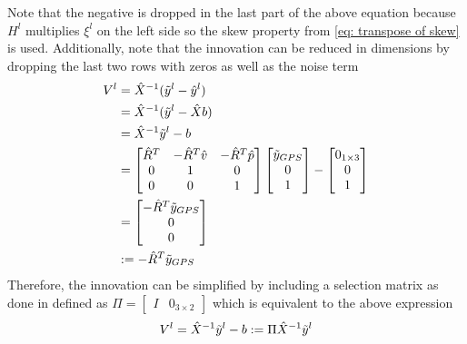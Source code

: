 Note that the negative is dropped in the last part of the above equation because $H^l$ multiplies $\xi^l$ on the left side so the skew property from \eqref{eq: transpose of skew} is used. Additionally, note that the innovation can be reduced in dimensions by dropping the last two rows with zeros as well as the noise term
\begin{equation}
    \begin{split}
        V^l &= \hat{X}^{-1} (\Tilde{y}^l  - \hat{y}^l ) \\
        &= \hat{X}^{-1} (\Tilde{y}^l - \hat{X} b) \\
        &= \hat{X}^{-1} \Tilde{y}^l  - b\\
        &= \begin{bmatrix}
            \hat{R}^T & -\hat{R}^T \hat{v} & -\hat{R}^T \hat{p} \\
            0 & 1 & 0\\
            0 & 0 & 1
        \end{bmatrix}
        \begin{bmatrix}
            \Tilde{y}_{GPS} \\
            0 \\
            1
        \end{bmatrix}
        - 
        \begin{bmatrix}
            0_{1 \times 3} \\
            0 \\
            1
        \end{bmatrix} \\
        &= 
        \begin{bmatrix}
            -\hat{R}^T \Tilde{y}_{GPS} \\
            0 \\
            0
        \end{bmatrix} \\
        &:= -\hat{R}^T \Tilde{y}_{GPS}
    \end{split}
    \label{eq: innovation meas LInEKF}
\end{equation}
Therefore, the innovation can be simplified by including a selection matrix as done in \cite{DBLP:journals/corr/BarrauB14} defined as $\Pi = \begin{bmatrix}
    I & 0_{3 \times 2} \end{bmatrix}$ which is equivalent to the above expression 
\begin{equation}
    V^l = \hat{X}^{-1} \Tilde{y}^l - b := \Pi \hat{X}^{-1} \Tilde{y}^l
    \label{eq: reduced measurement residual}
\end{equation} 
